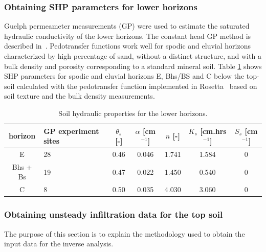 \documentclass[review,times,3p,twocolumn,10pt]{elsarticle}
\newcommand{\fs}{\footnotesize}
\begin{document}
\subsubsection{Obtaining SHP parameters for lower horizons}
\label{shp}

Guelph permeameter measurements (GP) were used to estimate the saturated hydraulic conductivity of the lower horizons. The constant head GP method is described in~\citep{Jacka1}.
Pedotransfer functions work well for spodic and eluvial horizons characterized by high percentage of sand, without a distinct structure, and with a bulk density and porosity corresponding to a standard mineral soil. Table \ref{tab_SHP} shows SHP parameters for spodic and eluvial horizons E, Bhs/BS and C below the top-soil calculated with the pedotransfer function implemented in Rosetta~\citep{Schaap} based on soil texture and the bulk density measurements.



 




\begin{table}[ht]
\begin{center}
\caption{Soil hydraulic properties for the lower horizons.}
\fs
\begin{tabular}{c | p{2cm} | c c c c c}
\toprule
horizon &  GP experiment sites  & $\theta_s$ [-] & $\alpha$ [cm$^{-1}$]& $n$ [-]& $K_s$ [cm.hrs$^{-1}$] & $S_s$ [cm$^{-1}$] \\ \hline
E & 28 &  0.46 & 0.046 & 1.741 & 1.584 & 0\\
Bhs + Bs & 19  &0.47&  0.022 & 1.450 & 0.540 & 0\\
C & 8 & 0.50 & 0.035 & 4.030 &  3.060 & 0 \\
\toprule
\end{tabular}
\label{tab_SHP}
\end{center}
\end{table}


\subsubsection{Obtaining unsteady infiltration data for the top soil}
\label{krivka}

The purpose of this section is to explain the methodology used to obtain the input data for the inverse analysis. 
\end{document}
